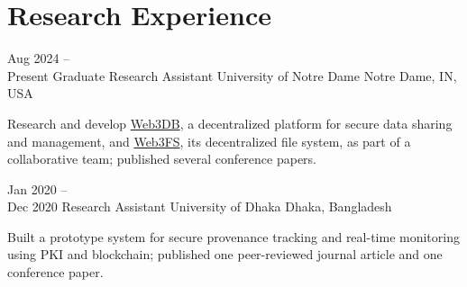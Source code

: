 \documentclass{academic-cv}
\begin{document}
\section{Research Experience}
\begin{cvlist}
    \cventry
        {Aug 2024 --\\ Present}
        {Graduate Research Assistant}
        {University of Notre Dame}
        {Notre Dame, IN, USA}
        \begin{cvbullets}
            \item Research and develop \href{https://www.web3db.org/}{Web3DB}, a decentralized platform for secure data sharing and management, and \href{https://fs.web3db.org/}{Web3FS}, its decentralized file system, as part of a collaborative team; published several conference papers.
        \end{cvbullets}

    \cventry
        {Jan 2020 --\\ Dec 2020}
        {Research Assistant}
        {University of Dhaka}
        {Dhaka, Bangladesh}
        \begin{cvbullets}
            \item Built a prototype system for secure provenance tracking and real-time monitoring using PKI and blockchain; published one peer-reviewed journal article and one conference paper.
        \end{cvbullets}
\end{cvlist}

\end{document}
